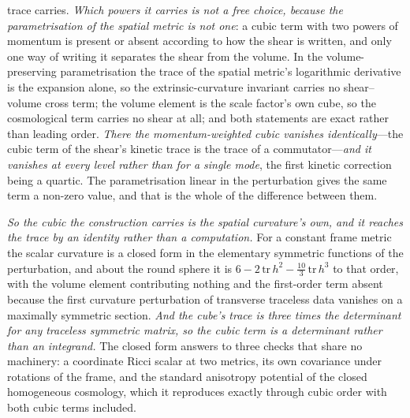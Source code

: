 \documentclass[11pt,a4paper]{article}
\theoremstyle{plain}
\theoremstyle{definition}
\theoremstyle{remark}
\begin{document}
trace carries. \emph{Which powers it carries is not a free choice, because the parametrisation of the spatial
metric is not one}: a cubic term with two powers of momentum is present or absent according to how the shear is
written, and only one way of writing it separates the shear from the volume. In the volume-preserving
parametrisation the trace of the spatial metric's logarithmic derivative is the expansion alone, so the
extrinsic-curvature invariant carries no shear--volume cross term; the volume element is the scale factor's own
cube, so the cosmological term carries no shear at all; and both statements are exact rather than leading order.
\emph{There the momentum-weighted cubic vanishes identically}---the cubic term of the shear's kinetic trace is
the trace of a commutator---\emph{and it vanishes at every level rather than for a single mode}, the first
kinetic correction being a quartic. The parametrisation linear in the perturbation gives the same term a
non-zero value, and that is the whole of the difference between
them.

\emph{So the cubic the construction carries is the spatial curvature's own, and it reaches the trace by an
identity rather than a computation.} For a constant frame metric the scalar curvature is a closed form in the
elementary symmetric functions of the perturbation, and about the round sphere it is
$6-2\,\mathrm{tr}\,h^{2}-\tfrac{10}{3}\,\mathrm{tr}\,h^{3}$ to that order, with the volume element contributing
nothing and the first-order term absent because the first curvature perturbation of transverse traceless data
vanishes on a maximally symmetric section. \emph{And the cube's trace is three times the determinant for any
traceless symmetric matrix, so the cubic term is a determinant rather than an integrand.} The closed form
answers to three checks that share no machinery: a coordinate Ricci scalar at two metrics, its own covariance
under rotations of the frame, and the standard anisotropy potential of the closed homogeneous cosmology, which
it reproduces exactly through cubic order with both cubic terms included.
\end{document}
